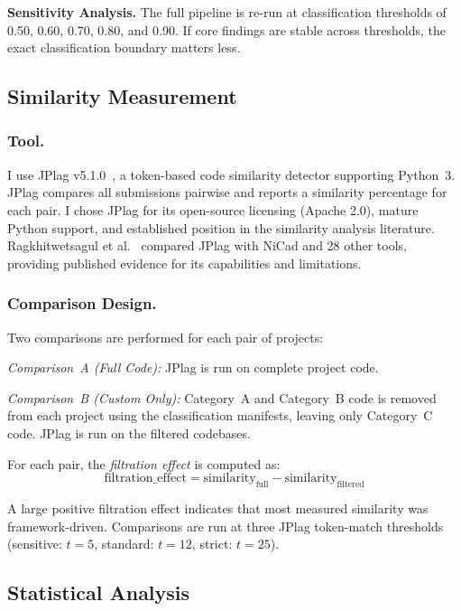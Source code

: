 \documentclass[smallextended,natbib]{svjour3}
\begin{document}
\textbf{Sensitivity Analysis.} The full pipeline is re-run at classification thresholds of 0.50, 0.60, 0.70, 0.80, and 0.90. If core findings are stable across thresholds, the exact classification boundary matters less.

\subsection{Similarity Measurement}

\subsubsection{Tool.}
I use JPlag v5.1.0~\citep{jplag2000,saglam2024}, a token-based code similarity detector supporting Python~3. JPlag compares all submissions pairwise and reports a similarity percentage for each pair. I chose JPlag for its open-source licensing (Apache 2.0), mature Python support, and established position in the similarity analysis literature. Ragkhitwetsagul et al.~\citep{ragkhitwetsagul2018} compared JPlag with NiCad and 28 other tools, providing published evidence for its capabilities and limitations.

\subsubsection{Comparison Design.}
Two comparisons are performed for each pair of projects:

\emph{Comparison~A (Full Code):} JPlag is run on complete project code.

\emph{Comparison~B (Custom Only):} Category~A and Category~B code is removed from each project using the classification manifests, leaving only Category~C code. JPlag is run on the filtered codebases.

For each pair, the \emph{filtration effect} is computed as:
\begin{equation}
\text{filtration\_effect} = \text{similarity}_\text{full} - \text{similarity}_\text{filtered}
\label{eq:filtration}
\end{equation}

A large positive filtration effect indicates that most measured similarity was framework-driven. Comparisons are run at three JPlag token-match thresholds (sensitive: $t=5$, standard: $t=12$, strict: $t=25$).

\subsection{Statistical Analysis}
\end{document}
